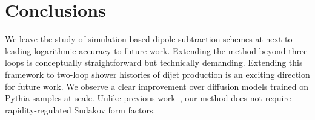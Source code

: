 \section{Conclusions}\label{sec:conclusions}

We leave the study of simulation-based dipole subtraction schemes at
next-to-leading logarithmic accuracy to future work. Extending the
method beyond three loops is conceptually straightforward but
technically demanding. Extending this framework to two-loop shower
histories of dijet production is an exciting direction for future work.
We observe a clear improvement over diffusion models trained on Pythia
samples at scale. Unlike previous
work~\cite{TPC:2059-Bridging-the-Gap-Between-Quantum-Computing-and-String-Theory-September-24-2026},
our method does not require rapidity-regulated Sudakov form factors.

